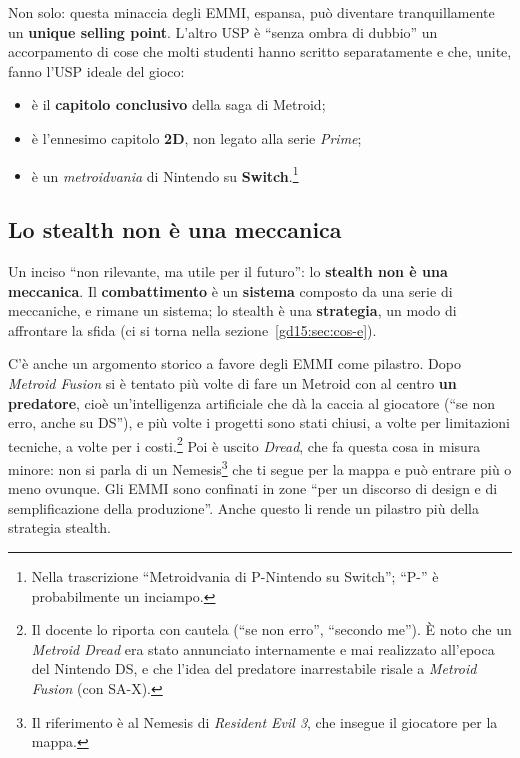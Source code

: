 Non solo: questa minaccia degli EMMI, espansa, può diventare tranquillamente
un \textbf{unique selling point}. L'altro USP è ``senza ombra di dubbio''
un accorpamento di cose che molti studenti hanno scritto separatamente e che,
unite, fanno l'USP ideale del gioco:
\begin{itemize}
  \item è il \textbf{capitolo conclusivo} della saga di Metroid;
  \item è l'ennesimo capitolo \textbf{2D}, non legato alla serie
        \emph{Prime};
  \item è un \emph{metroidvania} di Nintendo su \textbf{Switch}.\footnote{Nella
        trascrizione ``Metroidvania di P-Nintendo su Switch''; ``P-'' è
        probabilmente un inciampo.}
\end{itemize}

\subsection{Lo stealth non è una meccanica}

Un inciso ``non rilevante, ma utile per il futuro'': lo
\textbf{stealth non è una meccanica}. Il \textbf{combattimento} è un
\textbf{sistema} composto da una serie di meccaniche, e rimane un sistema;
lo stealth è una \textbf{strategia}, un modo di affrontare la sfida (ci si
torna nella sezione~\ref{gd15:sec:cos-e}).

C'è anche un argomento storico a favore degli EMMI come pilastro. Dopo
\emph{Metroid Fusion} si è tentato più volte di fare un Metroid con al
centro \textbf{un predatore}, cioè un'intelligenza artificiale che dà la
caccia al giocatore (``se non erro, anche su DS''), e più volte i progetti
sono stati chiusi, a volte per limitazioni tecniche, a volte per i
costi.\footnote{Il docente lo riporta con cautela (``se non erro'',
``secondo me''). È noto che un \emph{Metroid Dread} era stato annunciato
internamente e mai realizzato all'epoca del Nintendo DS, e che l'idea del
predatore inarrestabile risale a \emph{Metroid Fusion} (con SA-X).} Poi è
uscito \emph{Dread}, che fa questa cosa in misura minore: non si parla di un
Nemesis\footnote{Il riferimento è al Nemesis di \emph{Resident Evil 3}, che
insegue il giocatore per la mappa.} che ti segue per la mappa e può entrare
più o meno ovunque. Gli EMMI sono confinati in zone ``per un discorso di
design e di semplificazione della produzione''. Anche questo li rende un
pilastro più della strategia stealth.

